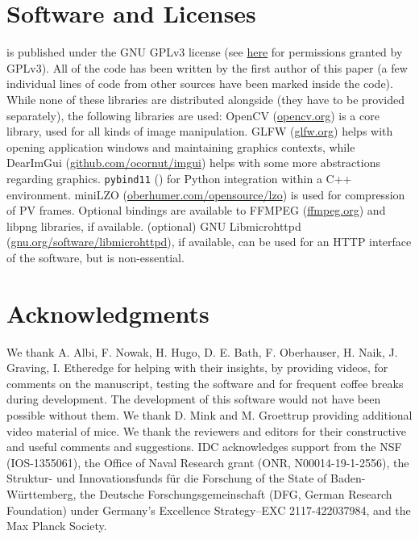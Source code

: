 \documentclass[9pt,lineno]{elife}
\newcommand{\TRex}{\protect\path{TRex}}
\newcommand{\changemade}[1]{#1}
\begin{document}
\section{Software and Licenses}

\TRex{} is published under the GNU GPLv3 license (see \href{https://choosealicense.com/licenses/gpl-3.0/}{here} for permissions granted by GPLv3). All of the code has been written by the first author of this paper (a few individual lines of code from other sources have been marked inside the code). While none of these libraries are distributed alongside \TRex{} (they have to be provided separately), the following libraries are used: OpenCV (\href{https://opencv.org/about/}{opencv.org}) is a core library, used for all kinds of image manipulation. GLFW (\href{https://www.glfw.org}{glfw.org}) helps with opening application windows and maintaining graphics contexts, while DearImGui (\href{https://github.com/ocornut/imgui}{github.com/ocornut/imgui}) helps with some more abstractions regarding graphics. \texttt{pybind11} (\cite{pybind11}) for Python integration within a C++ environment. miniLZO (\href{http://www.oberhumer.com/opensource/lzo/\#minilzo}{oberhumer.com/opensource/lzo}) is used for compression of PV frames. Optional bindings are available to FFMPEG (\href{http://ffmpeg.org}{ffmpeg.org}) and libpng libraries, if available. (optional) GNU Libmicrohttpd (\href{https://www.gnu.org/software/libmicrohttpd/}{gnu.org/software/libmicrohttpd}), if available, can be used for an HTTP interface of the software, but is non-essential.

\section{Acknowledgments}

We thank A. Albi, F. Nowak, H. Hugo, D. E. Bath, F. Oberhauser, H. Naik, J. Graving, I. Etheredge for helping with their insights, by providing videos, for comments on the manuscript, testing the software and for frequent coffee breaks during development. The development of this software would not have been possible without them. \changemade{We thank D. Mink and M. Groettrup providing additional video material of mice. We thank the reviewers and editors for their constructive and useful comments and suggestions.} IDC acknowledges support from the NSF (IOS-1355061), the Office of Naval Research grant (ONR, N00014-19-1-2556), the Struktur- und Innovationsfunds f\"{u}r die Forschung of the State of Baden-W\"{u}rttemberg, the Deutsche Forschungsgemeinschaft (DFG, German Research Foundation) under Germany's Excellence Strategy--EXC 2117-422037984, and the Max Planck Society.
\end{document}
